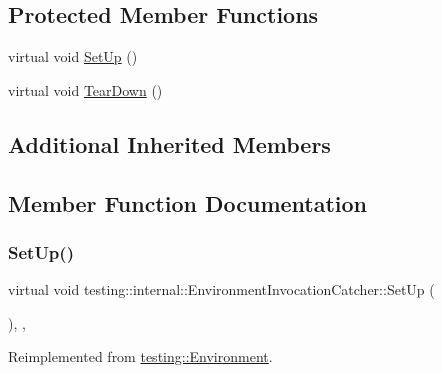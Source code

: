 \subsection*{Protected Member Functions}
\begin{DoxyCompactItemize}
\item 
virtual void \hyperlink{classtesting_1_1internal_1_1_environment_invocation_catcher_a325365b0ecfa71a4a767d7a1817c9663}{Set\+Up} ()
\item 
virtual void \hyperlink{classtesting_1_1internal_1_1_environment_invocation_catcher_afc89ee0a8e32e6746a89fcc1682f62e9}{Tear\+Down} ()
\end{DoxyCompactItemize}
\subsection*{Additional Inherited Members}


\subsection{Member Function Documentation}
\mbox{\label{classtesting_1_1internal_1_1_environment_invocation_catcher_a325365b0ecfa71a4a767d7a1817c9663}} 
\subsubsection{\texorpdfstring{Set\+Up()}{SetUp()}}
{\footnotesize\ttfamily virtual void testing\+::internal\+::\+Environment\+Invocation\+Catcher\+::\+Set\+Up (\begin{DoxyParamCaption}{ }\end{DoxyParamCaption})\hspace{0.3cm}{\ttfamily [inline]}, {\ttfamily [protected]}, {\ttfamily [virtual]}}



Reimplemented from \hyperlink{classtesting_1_1_environment_a1bf8cafaa9d4eba9feb98655ee434eb3}{testing\+::\+Environment}.

\mbox{\label{classtesting_1_1internal_1_1_environment_invocation_catcher_afc89ee0a8e32e6746a89fcc1682f62e9}} 

